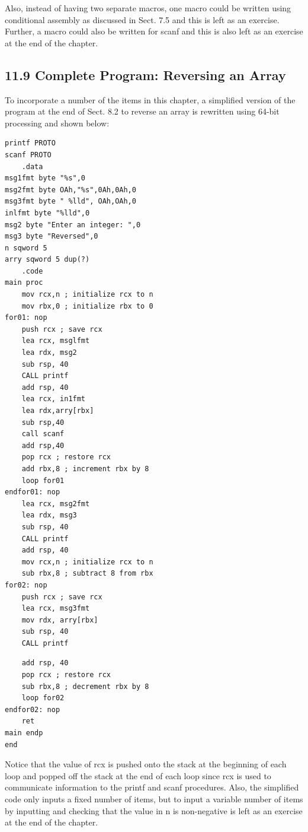 \documentclass[10pt]{book}
\begin{document}
\begin{center}
\begin{center}
\begin{center}
\begin{center}
Also, instead of having two separate macros, one macro could be written using conditional assembly as discussed in Sect. 7.5 and this is left as an exercise. Further, a macro could also be written for scanf and this is also left as an exercise at the end of the chapter.

\subsection*{11.9 Complete Program: Reversing an Array}
To incorporate a number of the items in this chapter, a simplified version of the program at the end of Sect. 8.2 to reverse an array is rewritten using 64-bit processing and shown below:

\begin{verbatim}
printf PROTO
scanf PROTO
    .data
msg1fmt byte "%s",0
msg2fmt byte OAh,"%s",0Ah,0Ah,0
msg3fmt byte " %lld", OAh,OAh,0
inlfmt byte "%lld",0
msg2 byte "Enter an integer: ",0
msg3 byte "Reversed",0
n sqword 5
arry sqword 5 dup(?)
    .code
main proc
    mov rcx,n ; initialize rcx to n
    mov rbx,0 ; initialize rbx to 0
for01: nop
    push rcx ; save rcx
    lea rcx, msglfmt
    lea rdx, msg2
    sub rsp, 40
    CALL printf
    add rsp, 40
    lea rcx, in1fmt
    lea rdx,arry[rbx]
    sub rsp,40
    call scanf
    add rsp,40
    pop rcx ; restore rcx
    add rbx,8 ; increment rbx by 8
    loop for01
endfor01: nop
    lea rcx, msg2fmt
    lea rdx, msg3
    sub rsp, 40
    CALL printf
    add rsp, 40
    mov rcx,n ; initialize rcx to n
    sub rbx,8 ; subtract 8 from rbx
for02: nop
    push rcx ; save rcx
    lea rcx, msg3fmt
    mov rdx, arry[rbx]
    sub rsp, 40
    CALL printf
\end{verbatim}

\begin{verbatim}
    add rsp, 40
    pop rcx ; restore rcx
    sub rbx,8 ; decrement rbx by 8
    loop for02
endfor02: nop
    ret
main endp
end
\end{verbatim}

Notice that the value of rcx is pushed onto the stack at the beginning of each loop and popped off the stack at the end of each loop since rcx is used to communicate information to the printf and scanf procedures. Also, the simplified code only inputs a fixed number of items, but to input a variable number of items by inputting and checking that the value in n is non-negative is left as an exercise at the end of the chapter.



\end{center}
\end{center}
\end{center}
\end{center}
\end{document}

